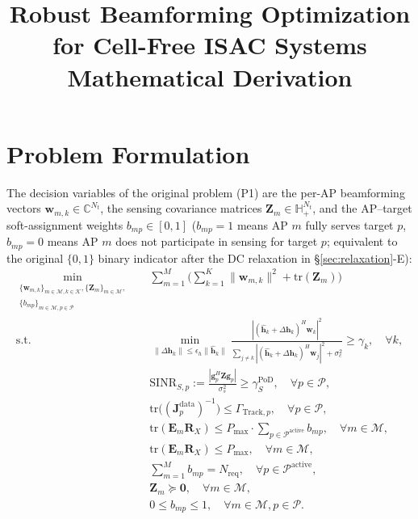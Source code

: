 \documentclass[12pt,a4paper]{article}
\title{\textbf{Robust Beamforming Optimization for Cell-Free ISAC Systems\\Mathematical Derivation}}
\author{}
\date{}
\newcommand{\vect}[1]{\mathbf{#1}}
\newcommand{\mat}[1]{\mathbf{#1}}
\newcommand{\tr}{\text{tr}}
\begin{document}
\maketitle

\section{Problem Formulation}\label{sec:formulation}

The decision variables of the original problem (P1) are the per-AP beamforming vectors $\vect{w}_{m,k} \in \mathbb{C}^{N_t}$, the sensing covariance matrices $\mat{Z}_m \in \mathbb{H}_+^{N_t}$, and the AP--target soft-assignment weights $b_{mp} \in [0,1]$ ($b_{mp}=1$ means AP $m$ fully serves target $p$, $b_{mp}=0$ means AP $m$ does not participate in sensing for target $p$; equivalent to the original $\{0,1\}$ binary indicator after the DC relaxation in \S\ref{sec:relaxation}-E):
\begin{align}
\min_{\substack{\{\vect{w}_{m,k}\}_{m \in \mathcal{M}, k \in \mathcal{K}}, \{\mat{Z}_m\}_{m \in \mathcal{M}}, \\ \{b_{mp}\}_{m \in \mathcal{M}, p \in \mathcal{P}}}} \quad
& \sum_{m=1}^{M} \Big( \sum_{k=1}^{K} \|\vect{w}_{m,k}\|^2 + \tr(\mat{Z}_m) \Big) \tag{P1-objective} \\
\text{s.t.} \quad
& \min_{\|\Delta\vect{h}_k\| \leq \epsilon_h \|\hat{\vect{h}}_k\|} \frac{|(\hat{\vect{h}}_k + \Delta\vect{h}_k)^H \vect{w}_k|^2}{\sum_{j \neq k} |(\hat{\vect{h}}_k + \Delta\vect{h}_k)^H \vect{w}_j|^2 + \sigma_c^2} \geq \gamma_k, \quad \forall k, \tag{P1-C1} \\
& \text{SINR}_{S,p} := \frac{|\vect{g}_p^H \mat{Z} \vect{g}_p|}{\sigma_s^2} \geq \gamma_S^{\text{PoD}}, \quad \forall p \in \mathcal{P}, \tag{P1-C2} \\
& \tr\big((\mat{J}_p^{\text{data}})^{-1}\big) \leq \Gamma_{\text{Track}, p}, \quad \forall p \in \mathcal{P}, \tag{P1-C3} \\
& \tr(\mat{E}_m \mat{R}_X) \leq P_{\max} \cdot \sum_{p \in \mathcal{P}^{\text{active}}} b_{mp}, \quad \forall m \in \mathcal{M}, \tag{P1-C4'a} \label{eq:p1c4a} \\
& \tr(\mat{E}_m \mat{R}_X) \leq P_{\max}, \quad \forall m \in \mathcal{M}, \tag{P1-C4'b} \label{eq:p1c4b} \\
& \sum_{m=1}^{M} b_{mp} = N_{\text{req}}, \quad \forall p \in \mathcal{P}^{\text{active}}, \tag{P1-C5'} \\
& \mat{Z}_m \succeq \mat{0}, \quad \forall m \in \mathcal{M}, \tag{P1-C6} \\
& 0 \leq b_{mp} \leq 1, \quad \forall m \in \mathcal{M}, p \in \mathcal{P}. \tag{P1-C7'}
\end{align}
\end{document}
